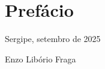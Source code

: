 \chapter*{Prefácio}

\begin{onehalfspace} %
	\lipsum[1-6] %
\end{onehalfspace}

\begin{flushright}
	Sergipe, setembro de 2025
	
	Enzo Libório Fraga
\end{flushright}